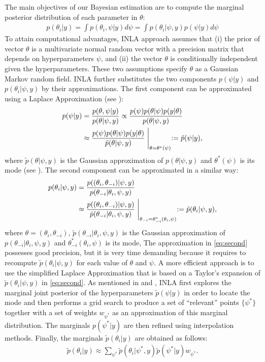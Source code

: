 \documentclass[11pt]{amsart}
\theoremstyle{plain}
\theoremstyle{definition}
\theoremstyle{remark}
\begin{document}
The main objectives of our Bayesian estimation are to compute the
marginal posterior distribution of each parameter in $\theta$:
\begin{align*}
  p(\theta_i|y) = \int p(\theta_i,\psi|y)d \psi = \int p(\theta_i|\psi,y)p(\psi|y)d \psi
\end{align*}
To attain computational advantages, INLA approach assumes that (i) the prior of vector $\theta$ is a multivariate normal random vector with a precision matrix that depends on hyperparameters $\psi$, and (ii) the vector
$\theta$ is conditionally independent given the hyperparameters. These two
assumptions specify $\theta$ as a Gaussian Markov random field. INLA further 
substitutes the two components $p(\psi|y)$ and $p(\theta_i|\psi,y)$ by their approximations. The first component can be approximated using a
Laplace Approximation (see \cite{Tierney1986}):
\begin{align*}
  p(\psi|y)&=\frac{p(\theta,\psi|y)}{p(\theta|\psi,y)}\propto \frac{p(\psi)p(\theta|\psi)p(y|\theta)}{p(\theta|\psi,y)}\\
           & \approx  \frac{p(\psi)p(\theta|\psi)p(y|\theta)}{\tilde p(\theta|\psi,y)} \Biggm |_{\theta=\theta^*(\psi)} := \tilde p(\psi|y),
\end{align*}
where $\tilde p(\theta|\psi,y)$ is the Gaussian approximation of
$p(\theta|\psi,y)$ and $\theta^*(\psi)$ is its mode (see \cite{Rue2009}). The
second component can be approximated in a similar way:
\begin{align}\label{eq:second}
  p(\theta_i|\psi,y)&=\frac{p((\theta_i,\theta_{-i})|\psi,y)}{p(\theta_{-i}|\theta_i,\psi,y)} \notag \\
  &\approx \frac{p((\theta_i,\theta_{-i})|\psi,y)}{\tilde p(\theta_{-i}|\theta_i,\psi,y)} \Biggm |_{\theta_{-i}=\theta_{-i}^*(\theta_i,\psi)}:=\tilde p(\theta_i|\psi,y),
\end{align}
where $\theta=(\theta_i,\theta_{-i})$, $\tilde p(\theta_{-i}|\theta_i,\psi,y)$ is the Gaussian approximation of
$p(\theta_{-i}|\theta_i,\psi,y)$ and $\theta_{-i}^*(\theta_i,\psi)$ is its mode,  
The approximation in \eqref{eq:second} possesses good precision, but it is very time demanding because it
requires to recompute $\tilde p(\theta_i|\psi,y)$ for each value of $\theta$ and $\psi$. A
more efficient approach is to use the simplified Laplace Approximation that is
based on a Taylor's expansion of $\tilde p(\theta_i|\psi,y)$ in 
\eqref{eq:second}. As mentioned in \cite{Rue2009} and \cite{Blangiardo2013},
INLA first explores the marginal joint posterior of the hyperparameters $\tilde
p(\psi | y)$ in order to locate the mode and then performs a grid search to 
produce a set of ``relevant'' points $\{\psi^*\}$ together with a set of weights
$w_{\psi^*}$ as an approximation of this marginal distribution. The marginals
$p(\psi^*|y)$ are then refined using interpolation methods. Finally, the marginals
$\tilde p(\theta_i|y)$ are obtained as follows:
\begin{align*}
  \tilde p(\theta_i|y) \approx \sum_{\psi^*}\tilde p(\theta_i|\psi^*,y)\tilde p(\psi^*|y)w_{\psi^*}.
\end{align*}
\end{document}
